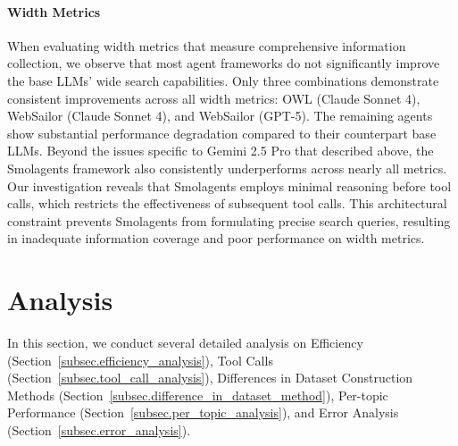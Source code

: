 \documentclass[11pt, letterpaper, logo, onecolumn, copyright, numbering]{paper_improved}
\begin{document}
\paragraph{Width Metrics}


When evaluating width metrics that measure comprehensive information collection, we observe that most agent frameworks do not significantly improve the base LLMs' wide search capabilities. Only three combinations demonstrate consistent improvements across all width metrics: OWL (Claude Sonnet 4), WebSailor (Claude Sonnet 4), and WebSailor (GPT-5). The remaining agents show substantial performance degradation compared to their counterpart base LLMs.
Beyond the issues specific to Gemini 2.5 Pro that described above, the Smolagents framework also consistently underperforms across nearly all metrics. 
Our investigation reveals that Smolagents employs minimal reasoning before tool calls, which restricts the effectiveness of subsequent tool calls. This architectural constraint prevents Smolagents from formulating precise search queries, resulting in inadequate information coverage and poor performance on width metrics.


\section{Analysis}

In this section, we conduct several detailed analysis on Efficiency (Section~\ref{subsec.efficiency_analysis}), Tool Calls (Section~\ref{subsec.tool_call_analysis}), Differences in Dataset Construction Methods (Section~\ref{subsec.difference_in_dataset_method}), Per-topic Performance (Section~\ref{subsec.per_topic_analysis}), and Error Analysis (Section~\ref{subsec.error_analysis}).
\end{document}
